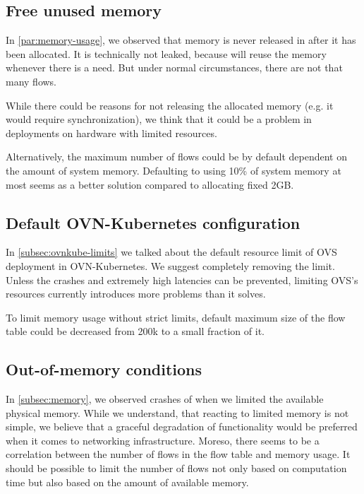 \subsection{Free unused memory}

In \cref{par:memory-usage}, we observed that memory is never released in  after it has been allocated. It is technically not leaked, because  will reuse the memory whenever there is a need. But under normal circumstances, there are not that many flows. 

While there could be reasons for not releasing the allocated memory (e.g. it would require synchronization), we think that it could be a problem in deployments on hardware with limited resources.

Alternatively, the maximum number of flows could be by default dependent on the amount of system memory. Defaulting to using 10\% of system memory at most seems as a better solution compared to allocating fixed 2GB.


\subsection{Default OVN-Kubernetes configuration}

In \cref{subsec:ovnkube-limits} we talked about the default resource limit of OVS deployment in OVN-Kubernetes. We suggest completely removing the limit. Unless the crashes and extremely high latencies can be prevented, limiting OVS's resources currently introduces more problems than it solves.

To limit memory usage without strict limits, default maximum size of the flow table could be decreased from 200k to a small fraction of it.


\subsection{Out-of-memory conditions}

In \cref{subsec:memory}, we observed crashes of  when we limited the available physical memory. While we understand, that reacting to limited memory is not simple, we believe that a graceful degradation of functionality would be preferred when it comes to networking infrastructure. Moreso, there seems to be a correlation between the number of flows in the flow table and memory usage. It should be possible to limit the number of flows not only based on computation time but also based on the amount of available memory.

